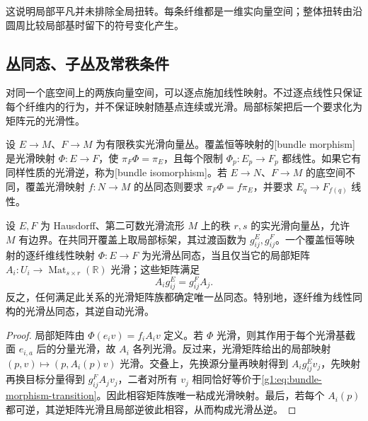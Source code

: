 这说明局部平凡并未排除全局扭转。每条纤维都是一维实向量空间；整体扭转由沿圆周比较局部基时留下的符号变化产生。

\subsection{丛同态、子丛及常秩条件}
\label{g1:subsec:1201:02}

对同一个底空间上的两族向量空间，可以逐点施加线性映射。不过逐点线性只保证每个纤维内的行为，并不保证映射随基点连续或光滑。局部标架把后一个要求化为矩阵元的光滑性。

\begin{definition}
	\label{g1:def:bundle-morphism}
	设 \(E\to M\)、\(F\to M\) 为有限秩实光滑向量丛。覆盖恒等映射的[bundle morphism]是光滑映射 \(\Phi:E\to F\)，使 \(\pi_F\Phi=\pi_E\)，且每个限制 \(\Phi_p:E_p\to F_p\) 都线性。如果它有同样性质的光滑逆，称为[bundle isomorphism]。若 \(E\to N\)、\(F\to M\) 的底空间不同，覆盖光滑映射 \(f:N\to M\) 的丛同态则要求 \(\pi_F\Phi=f\pi_E\)，并要求 \(E_q\to F_{f(q)}\) 线性。
\end{definition}

\begin{proposition}
	\label{g1:prop:bundle-morphism-matrices}
	设 \(E,F\) 为 Hausdorff、第二可数光滑流形 \(M\) 上的秩 \(r,s\) 的实光滑向量丛，允许 \(M\) 有边界。在共同开覆盖上取局部标架，其过渡函数为 \(g_{ij}^E,g_{ij}^F\)。一个覆盖恒等映射的逐纤维线性映射 \(\Phi:E\to F\) 为光滑丛同态，当且仅当它的局部矩阵 \(A_i:U_i\to\operatorname{Mat}_{s\times r}(\mathbb R)\) 光滑；这些矩阵满足
	\begin{equation}
		\label{g1:eq:bundle-morphism-transition}
		A_i g_{ij}^E=g_{ij}^F A_j.
	\end{equation}
	反之，任何满足此关系的光滑矩阵族都确定唯一丛同态。特别地，逐纤维为线性同构的光滑丛同态，其逆自动光滑。
\end{proposition}
\begin{proof}
	局部矩阵由 \(\Phi(e_i v)=f_i A_i v\) 定义。若 \(\Phi\) 光滑，则其作用于每个光滑基截面 \(e_{i,a}\) 后的分量光滑，故 \(A_i\) 各列光滑。反过来，光滑矩阵给出的局部映射 \((p,v)\mapsto(p,A_i(p)v)\) 光滑。交叠上，先换源分量再映射得到 \(A_i g_{ij}^E v_j\)，先映射再换目标分量得到 \(g_{ij}^F A_jv_j\)，二者对所有 \(v_j\) 相同恰好等价于\eqref{g1:eq:bundle-morphism-transition}。因此相容矩阵族唯一粘成光滑映射。最后，若每个 \(A_i(p)\) 都可逆，其逆矩阵光滑且局部逆彼此相容，从而构成光滑丛逆。
\end{proof}

